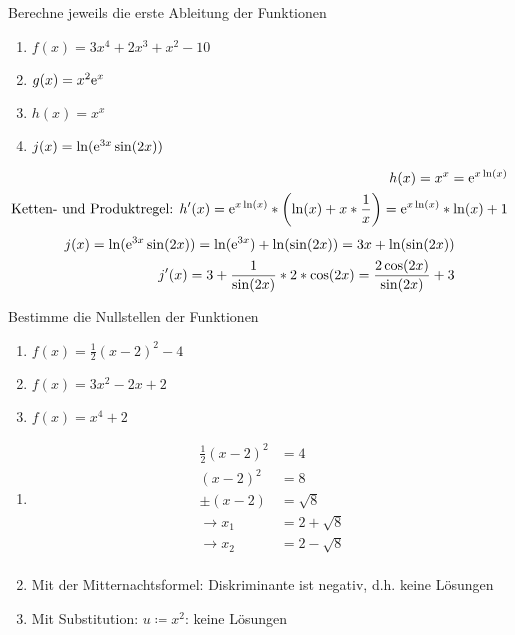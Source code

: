  Berechne jeweils die erste Ableitung der Funktionen
\begin{enumerate}
	\item $f(x)=3x^4+2x^3+x^2-10$
  \item $g(x)=x^2\mathrm{e}^x$
	\item $h(x)=x^x$
  \item $j(x)=\ln(\mathrm{e}^{3x}\sin(2x))$
\end{enumerate}
\begin{lsg}{}
  \begin{align*}
    h(x)= x^x= \mathrm{e}^{x\ln(x)}\\
    \text{Ketten- und Produktregel: } h'(x)=\mathrm{e}^{x\ln(x)}* \left(\ln(x)+x*\frac{1}{x}\right) = \mathrm{e}^{x\ln(x)}*\ln(x)+1
  \end{align*}
  \begin{align*}
    j(x)= \ln(\mathrm{e}^{3x}\sin(2x)) = \ln(\mathrm{e}^{3x}) + \ln(\sin(2x)) = 3x + \ln(\sin(2x))\\
    j'(x)=3+\frac{1}{\sin(2x)} * 2*\cos(2x) = \frac{2\cos(2x)}{\sin(2x)}+3
  \end{align*}
\end{lsg}






 Bestimme die Nullstellen der Funktionen
\begin{multicols}{3}
  \begin{enumerate}
    \item $f(x) = \frac 1 2 (x-2)^2 -4$
    \item $f(x) = 3x^2-2x+2$
    \item $f(x) = x^4+2$
  \end{enumerate}
\end{multicols}

\begin{lsg}{}
  \begin{multicols}{3}
    \begin{enumerate}
      \item \begin{align*}
        \frac 1 2 (x-2)^2 &= 4\\
        (x-2)^2 &= 8\\
        \pm(x-2)&=\sqrt 8\\
        \rightarrow x_1&=2+\sqrt 8\\
        \rightarrow x_2&=2-\sqrt 8\\
      \end{align*}
      \columnbreak
      \item Mit der Mitternachtsformel: Diskriminante ist negativ, d.h. keine Lösungen
      \columnbreak
      \item Mit Substitution: $u\coloneqq x^2$: keine Lösungen
    \end{enumerate}
  \end{multicols}
\end{lsg}


